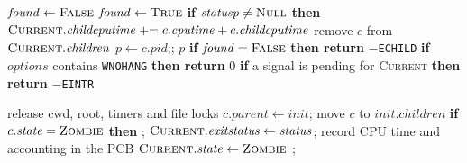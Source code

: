 \begin{algorithm}[H]
\caption{\texttt{waitpid(pid, statusp, options)} --- collect a terminated child}
\label{p4:alg:waitpid}
\begin{algorithmic}[1]
  \Loop
    \State $\mathit{found} \gets \textsc{False}$
      \State $\mathit{found} \gets \textsc{True}$
        \State \textbf{if} $\mathit{statusp} \neq \textsc{Null}$ \textbf{then}
        \State $\textsc{Current}.\mathit{childcputime} \mathrel{+}= c.\mathit{cputime} + c.\mathit{childcputime}$
        \State remove $c$ from $\textsc{Current}.\mathit{children}$
        \State $p \gets c.\mathit{pid}$;\quad {};\quad {}
        \State \Return $p$
      \EndIf
    \EndFor
    \State \textbf{if} $\mathit{found} = \textsc{False}$ \textbf{then return} $-$\texttt{ECHILD}
    \State \textbf{if} $\mathit{options}$ contains \texttt{WNOHANG} \textbf{then return} $0$
    \State \textbf{if} a signal is pending for \textsc{Current} \textbf{then return} $-$\texttt{EINTR}
    \State {}
  \EndLoop
\EndProcedure
\end{algorithmic}
\end{algorithm}

\begin{algorithm}[H]
\caption{\texttt{exit(status)} --- terminate the calling process}
\label{p4:alg:exit}
\begin{algorithmic}[1]
    \State {}
  \EndFor
  \State {}
  \State release cwd, root, timers and file locks
    \State $c.\mathit{parent} \gets \mathit{init}$; move $c$ to $\mathit{init}.\mathit{children}$
    \State \textbf{if} $c.\mathit{state} = \textsc{Zombie}$ \textbf{then}
           ; 
  \EndFor
  \State $\textsc{Current}.\mathit{exitstatus} \gets \mathit{status}$; record CPU time and accounting in the PCB
  \State $\textsc{Current}.\mathit{state} \gets \textsc{Zombie}$
  \State {};
  \State {}
\EndProcedure
\end{algorithmic}
\end{algorithm}

